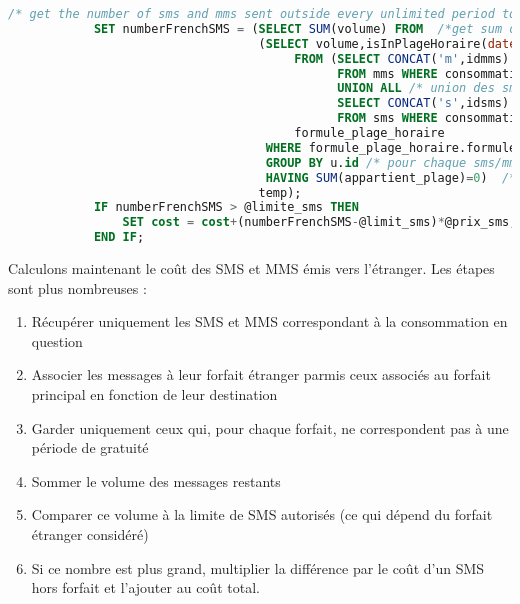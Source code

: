 \begin{lstlisting}[language=sql]
/* get the number of sms and mms sent outside every unlimited period to a french phone for the right month*/
            SET numberFrenchSMS = (SELECT SUM(volume) FROM  /*get sum of the remaining volume of sms and mms */
                                   (SELECT volume,isInPlageHoraire(date, formule_plage_horaire.plage_horaire) as appartient_plage
                                        FROM (SELECT CONCAT('m',idmms) as id, volume, date
                                              FROM mms WHERE consommation=consoId AND destination=1
                                              UNION ALL /* union des sms (dont l'id est préfixé par s) et des mms (dont l'id est préfixé par m) */
                                              SELECT CONCAT('s',idsms) as id, volume, date
                                              FROM sms WHERE consommation=consoId AND destination=1) u,
                                        formule_plage_horaire
                                    WHERE formule_plage_horaire.formule=@formule_id /*récupération des plages horaires correspondant à la formule */
                                    GROUP BY u.id /* pour chaque sms/mms...*/
                                    HAVING SUM(appartient_plage)=0)  /* ... on regarde si la date d'envoi est compris dans au moins une plage */
                                   temp);
            IF numberFrenchSMS > @limite_sms THEN
                SET cost = cost+(numberFrenchSMS-@limit_sms)*@prix_sms;
            END IF;
\end{lstlisting}


Calculons maintenant le coût des SMS et MMS émis vers l'étranger. Les étapes sont plus nombreuses :
\begin{enumerate}
	\item Récupérer uniquement les SMS et MMS correspondant à la consommation en question
	\item Associer les messages à leur forfait étranger parmis ceux associés au forfait principal en fonction de leur destination
	\item Garder uniquement ceux qui, pour chaque forfait, ne correspondent pas à une période de gratuité
	\item Sommer le volume des messages restants
	\item Comparer ce volume à la limite de SMS autorisés (ce qui dépend du forfait étranger considéré)
	\item Si ce nombre est plus grand, multiplier la différence par le coût d'un SMS hors forfait et l'ajouter au coût total.
\end{enumerate}

